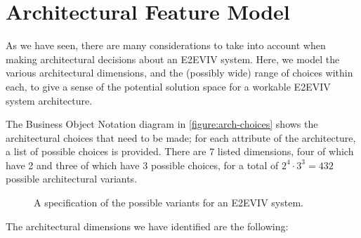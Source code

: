 \section{Architectural Feature Model}

As we have seen, there are many considerations to take into account
when making architectural decisions about an E2EVIV system. Here, we
model the various architectural dimensions, and the (possibly wide)
range of choices within each, to give a sense of the potential
solution space for a workable E2EVIV system architecture.

The Business Object Notation diagram in \autoref{figure:arch-choices}
shows the architectural choices that need to be made; for each
attribute of the architecture, a list of possible choices is
provided. There are 7 listed dimensions, four of which have 2 and
three of which have 3 possible choices, for a total of
$2^4\cdot{}3^3=432$ possible architectural variants.

\begin{figure}[t]
\begin{center}

\end{center}
\caption{A specification of the possible variants for an E2EVIV system.}
\label{figure:arch-choices}
\end{figure}

The architectural dimensions we have identified are the following:

